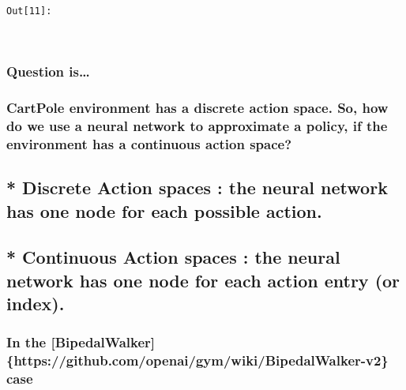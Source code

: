 \documentclass[11pt]{article}
\begin{document}
\texttt{\color{outcolor}Out[{\color{outcolor}11}]:}
    
    \begin{center}
    \end{center}
    { \hspace*{\fill} \\}
    

    \hypertarget{question-is}{%
\subsubsection{Question is\ldots{}}\label{question-is}}

\hypertarget{cartpole-environment-has-a-discrete-action-space.-so-how-do-we-use-a-neural-network-to-approximate-a-policy-if-the-environment-has-a-continuous-action-space}{%
\subsubsection{CartPole environment has a discrete action space. So, how
do we use a neural network to approximate a policy, if the environment
has a continuous action
space?}\label{cartpole-environment-has-a-discrete-action-space.-so-how-do-we-use-a-neural-network-to-approximate-a-policy-if-the-environment-has-a-continuous-action-space}}

\hypertarget{discrete-action-spaces-the-neural-network-has-one-node-for-each-possible-action.}{%
\subsection{* Discrete Action spaces : the neural network has one node
for each possible
action.}\label{discrete-action-spaces-the-neural-network-has-one-node-for-each-possible-action.}}

\hypertarget{continuous-action-spaces-the-neural-network-has-one-node-for-each-action-entry-or-index.}{%
\subsection{* Continuous Action spaces : the neural network has one node
for each action entry (or
index).}\label{continuous-action-spaces-the-neural-network-has-one-node-for-each-action-entry-or-index.}}

    \hypertarget{in-the-bipedalwalker-httpsgithub.comopenaigymwikibipedalwalker-v2-case}{%
\subsubsection{In the {[}BipedalWalker{]}
\{https://github.com/openai/gym/wiki/BipedalWalker-v2\}
case}\label{in-the-bipedalwalker-httpsgithub.comopenaigymwikibipedalwalker-v2-case}}
\end{document}

